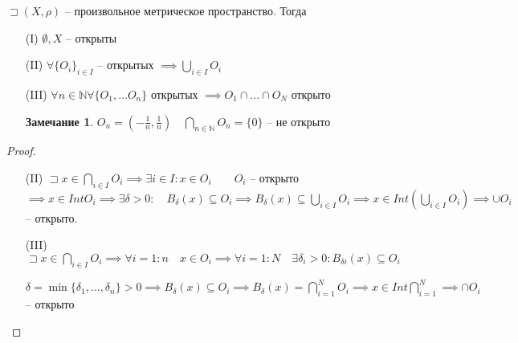 \documentclass{book}
\newcommand\N{\ensuremath{\mathbb{N}}}
\renewcommand\O{\ensuremath{\emptyset}}
\theoremstyle{definition}
\newtheorem*{note}{Замечание}
\begin{document}
\begin{theorem}

    $\sqsupset (X, \rho)$ -- произвольное метрическое пространство. Тогда 
    \begin{enumerate}
        \item [(I)]$\O , X$ -- открыты
        \item [(II)] $\forall  \{O_i\}_{i\in I}$ -- открытых $ \implies  \bigcup\limits_{i \in  I} O_i$
        \item [(III)] $\forall n\in \N \forall \{O_1, \ldots O_n\}$ открытых $\implies  O_1\cap \ldots \cap O_N$ открыто

            \begin{note}
                $O_n = \left( -\frac{1}{n}, \frac{1}{n} \right) \quad \bigcap\limits_{n\in \N } O_n = \{0\}$ -- не открыто
            \end{note}
    \end{enumerate}
\end{theorem}
\begin{proof}
    \begin{itemize}
        \item [(II)] $\sqsupset x\in \bigcap\limits_{i \in  I} O_i \implies  \exists i\in I: x\in O_i\qquad O_i$ -- открыто $\implies x\in Int O_i \implies  \exists \delta >0:\quad B_{\delta}(x) \subseteq O_i \implies  B_{\delta}(x) \subseteq \bigcup\limits_{i \in  I}  O_i \implies  x\in Int\left( \bigcup\limits_{i \in  I} O_i \right)  \implies  \cup O_i$ -- открыто.
        \item [(III)] $\sqsupset x\in \bigcap\limits_{i \in  I} O_i \implies \forall i = 1:n\quad x\in O_i \implies  \forall i = 1:N\quad \exists \delta_i>0: B_{\delta i}(x) \subseteq O_i$

            $\delta = \min \{\delta_1, \ldots, \delta_n\} >0 \implies  B_{\delta}(x) \subseteq O_i \implies  B_{\delta}(x) = \bigcap\limits_{i=1} ^N O_i \implies  x\in Int \bigcap\limits_{i =1}^N \implies \cap O_i $ -- открыто
    \end{itemize}
\end{proof}
\end{document}
